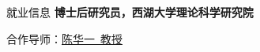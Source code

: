 \begin{rubric}{就业信息}
\entry*[2025--2027]%
	\textbf{博士后研究员，西湖大学理论科学研究院}
	\par 合作导师：\href{https://chenhuayi.lab.westlake.edu.cn/}{陈华一\ 教授}
\end{rubric}